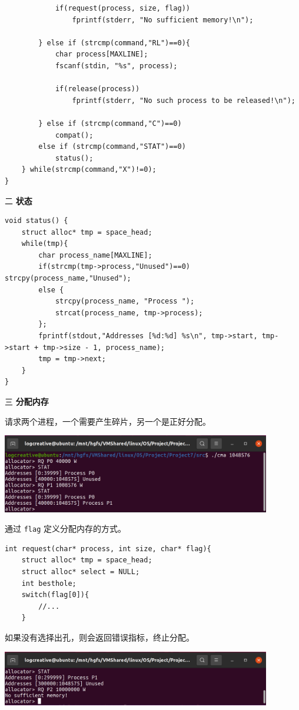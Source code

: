 \documentclass[12pt,a4paper]{article}
\newenvironment{problems}{\begin{list}{}{\renewcommand{\makelabel}[1]{\textbf{##1}\hfil}}}{\end{list}}
\begin{document}
\begin{problems}
\begin{lstlisting}
            if(request(process, size, flag))
                fprintf(stderr, "No sufficient memory!\n");
            
        } else if (strcmp(command,"RL")==0){
            char process[MAXLINE];
            fscanf(stdin, "%s", process);

            if(release(process))
                fprintf(stderr, "No such process to be released!\n");

        } else if (strcmp(command,"C")==0)
            compat();
        else if (strcmp(command,"STAT")==0) 
            status();
    } while(strcmp(command,"X")!=0);
}
    \end{lstlisting}

    \item[二] \textbf{状态}
    \begin{lstlisting}
void status() {
    struct alloc* tmp = space_head;
    while(tmp){
        char process_name[MAXLINE];
        if(strcmp(tmp->process,"Unused")==0) strcpy(process_name,"Unused");
        else { 
            strcpy(process_name, "Process ");
            strcat(process_name, tmp->process);
        };
        fprintf(stdout,"Addresses [%d:%d] %s\n", tmp->start, tmp->start + tmp->size - 1, process_name);
        tmp = tmp->next;
    }
}
    \end{lstlisting} 

    \item[三] \textbf{分配内存}
    
    请求两个进程，一个需要产生碎片，另一个是正好分配。

    \includegraphics[width=0.88\textwidth]{RQ.png}

    通过 \texttt{flag} 定义分配内存的方式。
    \begin{lstlisting}
int request(char* process, int size, char* flag){
    struct alloc* tmp = space_head;
    struct alloc* select = NULL;
    int besthole;
    switch(flag[0]){
        //...
    }
    \end{lstlisting}
    如果没有选择出孔，则会返回错误指标，终止分配。

    \includegraphics[width=0.88\textwidth]{RQN.png}


\end{problems}
\end{document}

